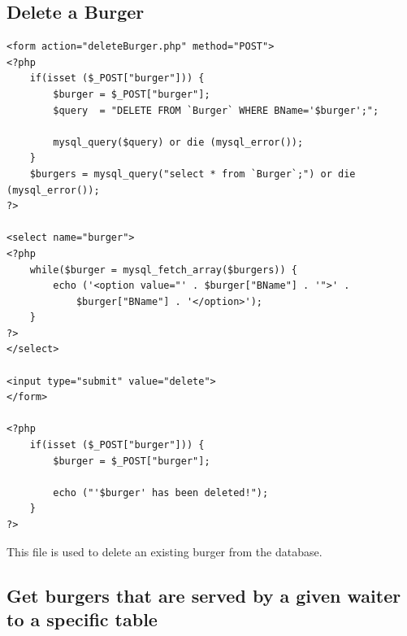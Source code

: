 \documentclass[10pt, a4paper]{article}
\begin{document}
\subsection{Delete a Burger}

\begin{lstlisting}[caption=deleteBurger.php]
<form action="deleteBurger.php" method="POST">
<?php
    if(isset ($_POST["burger"])) {
        $burger = $_POST["burger"];
        $query  = "DELETE FROM `Burger` WHERE BName='$burger';";
        
        mysql_query($query) or die (mysql_error());
    }
    $burgers = mysql_query("select * from `Burger`;") or die (mysql_error());
?>

<select name="burger">
<?php
    while($burger = mysql_fetch_array($burgers)) {
        echo ('<option value="' . $burger["BName"] . '">' . 
            $burger["BName"] . '</option>');
    }    
?>
</select>

<input type="submit" value="delete">
</form>

<?php
    if(isset ($_POST["burger"])) {
        $burger = $_POST["burger"];
        
        echo ("'$burger' has been deleted!");
    }
?>
\end{lstlisting}
This file is used to delete an existing burger from the database.

\subsection{Get burgers that are served by a given waiter to a specific table}
\end{document}
